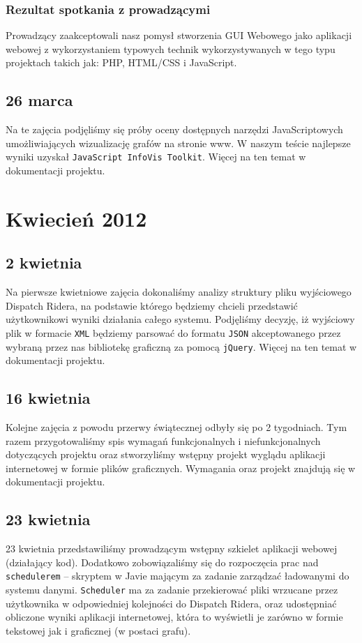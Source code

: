 \subsubsection{Rezultat spotkania z prowadzącymi}
Prowadzący zaakceptowali nasz pomysł stworzenia GUI Webowego jako aplikacji webowej z wykorzystaniem typowych technik wykorzystywanych
w tego typu projektach takich jak: PHP, HTML/CSS i JavaScript.

\subsection{26 marca}
Na te zajęcia podjęliśmy się próby oceny dostępnych narzędzi JavaScriptowych umożliwiających wizualizację grafów na stronie www.
W naszym teście najlepsze wyniki uzyskał \texttt{JavaScript InfoVis Toolkit}. Więcej na ten temat w dokumentacji projektu.


\section{Kwiecień 2012}
\subsection{2 kwietnia}
Na pierwsze kwietniowe zajęcia dokonaliśmy analizy struktury pliku wyjściowego Dispatch Ridera, na podstawie którego będziemy
chcieli przedstawić użytkownikowi wyniki działania całego systemu. Podjęliśmy decyzję, iż wyjściowy plik w formacie \texttt{XML}
będziemy parsować do formatu \texttt{JSON} akceptowanego przez wybraną przez nas bibliotekę graficzną za pomocą \texttt{jQuery}.
Więcej na ten temat w dokumentacji projektu.

\subsection{16 kwietnia}
Kolejne zajęcia z powodu przerwy świątecznej odbyły się po 2 tygodniach. Tym razem przygotowaliśmy spis wymagań
funkcjonalnych i niefunkcjonalnych dotyczących projektu oraz stworzyliśmy wstępny projekt wyglądu aplikacji internetowej
w formie plików graficznych. Wymagania oraz projekt znajdują się w dokumentacji projektu.

\subsection{23 kwietnia}
23 kwietnia przedstawiliśmy prowadzącym wstępny szkielet aplikacji webowej (działający kod). Dodatkowo zobowiązaliśmy się
do rozpoczęcia prac nad \texttt{schedulerem} -- skryptem w Javie mającym za zadanie zarządzać ładowanymi do systemu danymi.
\texttt{Scheduler} ma za zadanie przekierować pliki wrzucane przez użytkownika w odpowiedniej kolejności do Dispatch Ridera, oraz udostępniać
obliczone wyniki aplikacji internetowej, która to wyświetli je zarówno w formie tekstowej jak i graficznej (w postaci grafu).

